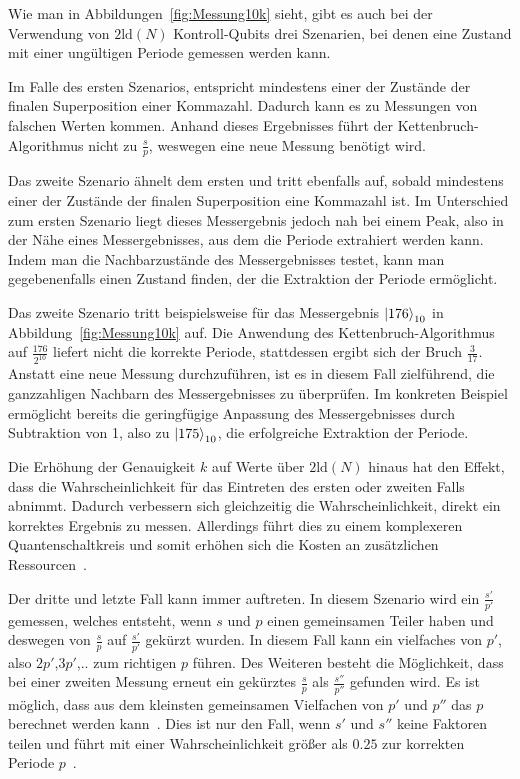 Wie man in Abbildungen~\ref{fig:Messung10k} sieht, 
gibt es auch bei der Verwendung von \(2\text{ld}(N)\) Kontroll-Qubits drei Szenarien, 
bei denen eine Zustand mit einer ungültigen Periode gemessen werden kann.

Im Falle des ersten Szenarios, 
entspricht mindestens einer der Zustände der finalen Superposition einer Kommazahl.
Dadurch kann es zu Messungen von falschen Werten kommen.
Anhand dieses Ergebnisses führt der Kettenbruch-Algorithmus nicht zu \(\frac{s}{p}\), 
weswegen eine neue Messung benötigt wird.

Das zweite Szenario ähnelt dem ersten und tritt ebenfalls auf, 
sobald mindestens einer der Zustände der finalen Superposition eine Kommazahl ist. 
Im Unterschied zum ersten Szenario liegt dieses Messergebnis jedoch nah bei einem Peak, 
also in der Nähe eines Messergebnisses, aus dem die Periode extrahiert werden kann. 
Indem man die Nachbarzustände des Messergebnisses testet, kann man gegebenenfalls einen Zustand finden, 
der die Extraktion der Periode ermöglicht.

Das zweite Szenario tritt beispielsweise für das Messergebnis \(\ket{176}_{10}\) in Abbildung~\ref{fig:Messung10k} auf.
Die Anwendung des Kettenbruch-Algorithmus auf \(\frac{176}{2^{10}}\) 
liefert nicht die korrekte Periode, stattdessen ergibt sich der Bruch \(\frac{3}{17}\). 
Anstatt eine neue Messung durchzuführen,
ist es in diesem Fall zielführend, 
die ganzzahligen Nachbarn des Messergebnisses zu überprüfen.
Im konkreten Beispiel ermöglicht bereits die geringfügige Anpassung des Messergebnisses durch Subtraktion von 1, 
also zu \(\ket{175}_{10}\), 
die erfolgreiche Extraktion der Periode.

Die Erhöhung der Genauigkeit \(k\) auf Werte über \(2\text{ld}(N)\) hinaus hat den Effekt, 
dass die Wahrscheinlichkeit für das Eintreten des ersten oder zweiten Falls abnimmt.
Dadurch verbessern sich gleichzeitig die Wahrscheinlichkeit, direkt ein korrektes Ergebnis zu messen.
Allerdings führt dies zu einem komplexeren Quantenschaltkreis und 
somit erhöhen sich die Kosten an zusätzlichen Ressourcen~\autocite[229]{nielsen_chuang_2010}.

Der dritte und letzte Fall kann immer auftreten.
In diesem Szenario wird ein \(\frac{s'}{p'}\) gemessen, 
welches entsteht, wenn \(s\) und \(p\) einen gemeinsamen Teiler haben und 
deswegen von \(\frac{s}{p}\) auf \(\frac{s'}{p'}\) gekürzt wurden.
In diesem Fall kann ein vielfaches von \(p'\), also \(2p'\),\(3p'\),.. zum richtigen \(p\) führen.
Des Weiteren besteht die Möglichkeit, 
dass bei einer zweiten Messung erneut ein gekürztes \(\frac{s}{p}\) als \(\frac{s''}{p''}\) gefunden wird.
Es ist möglich, dass aus dem kleinsten gemeinsamen Vielfachen von \(p'\) und \(p''\) das \(p\) berechnet werden kann~\cite{Shor_1997}.
Dies ist nur den Fall, wenn \(s'\) und \(s''\) keine Faktoren teilen und 
führt mit einer Wahrscheinlichkeit größer als \(0.25\) zur korrekten Periode \(p\)~\autocite[231]{nielsen_chuang_2010}.

